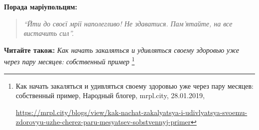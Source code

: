 \textbf{Порада маріупольцям:} 

\begin{quote}
\em\enquote{Йти до своєї мрії наполегливо! Не здаватися. Пам’ятайте, на все вистачить сил}. 
\end{quote}

\textbf{Читайте також:} \emph{Как начать закаляться и удивляться своему здоровью уже через пару месяцев: собственный пример}%
\footnote{Как начать закаляться и удивляться своему здоровью уже через пару месяцев: собственный пример, Народный блогер, %
mrpl.city, 28.01.2019, \par%
\url{https://mrpl.city/blogs/view/kak-nachat-zakalyatsya-i-udivlyatsya-svoemu-zdorovyu-uzhe-cherez-paru-mesyatsev-sobstvennyj-primer}
}
